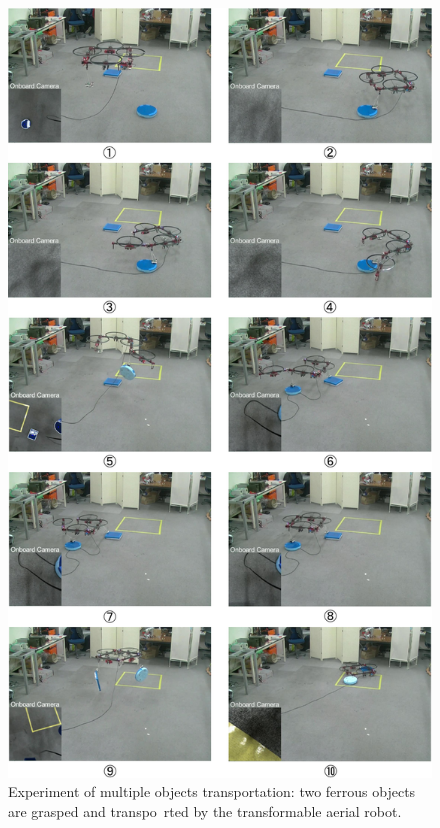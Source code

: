 \begin{figure}[b]
  \begin{center}
    \includegraphics[width=0.6\columnwidth]{figs/experiment.pdf}
  \end{center}
  \caption{Experiment of multiple objects transportation: two ferrous objects are grasped and transpo\
rted by the transformable aerial robot.\label{figure:experiment}}
\end{figure}

